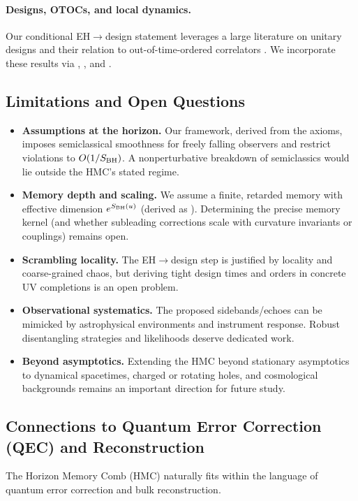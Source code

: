 \documentclass[a4paper,11pt]{article}
\newcommand{\HMC}{\textup{\textsc{HMC}}\xspace}
\theoremstyle{plain}
\theoremstyle{definition}
\theoremstyle{remark}
\begin{document}
\paragraph{Designs, OTOCs, and local dynamics.}
Our conditional EH$\to$design statement leverages a large literature on unitary designs
\cite{Dankert:2009,HarrowLow:2009,BHH:2016,HunterJones:2019} and their relation to out-of-time-ordered correlators
\cite{RobertsYoshida:2017,Cotler:2017}.
We incorporate these results via , , and .

\subsection{Limitations and Open Questions}
\label{sec:limitations-oq}
\begin{itemize}[leftmargin=*]
    \item \textbf{Assumptions at the horizon.} Our framework, derived from the axioms, imposes semiclassical
    smoothness for freely falling observers and restrict violations to
    \(O(1/S_{\rm BH})\). A nonperturbative breakdown of semiclassics would lie
    outside the \HMC{}'s stated regime.
    \item \textbf{Memory depth and scaling.} We assume a finite, retarded memory with
    effective dimension \(e^{S_{\rm BH}(u)}\) (derived as ). Determining the precise memory kernel
    (and whether subleading corrections scale with curvature invariants or
    couplings) remains open.
    \item \textbf{Scrambling locality.} The EH\(\rightarrow\)design step is justified by
    locality and coarse-grained chaos, but deriving tight design times and orders
    in concrete UV completions is an open problem.
    \item \textbf{Observational systematics.} The proposed sidebands/echoes can be
    mimicked by astrophysical environments and instrument response. Robust
    disentangling strategies and likelihoods deserve dedicated work.
    \item \textbf{Beyond asymptotics.} Extending the \HMC{} beyond stationary asymptotics to dynamical spacetimes, charged or rotating holes, and cosmological backgrounds remains an important direction for future study.
\end{itemize}


\subsection{Connections to Quantum Error Correction (QEC) and Reconstruction}
\label{subsec:qec}
The Horizon Memory Comb (\HMC{}) naturally fits within the language of quantum error correction and bulk reconstruction.
\end{document}
